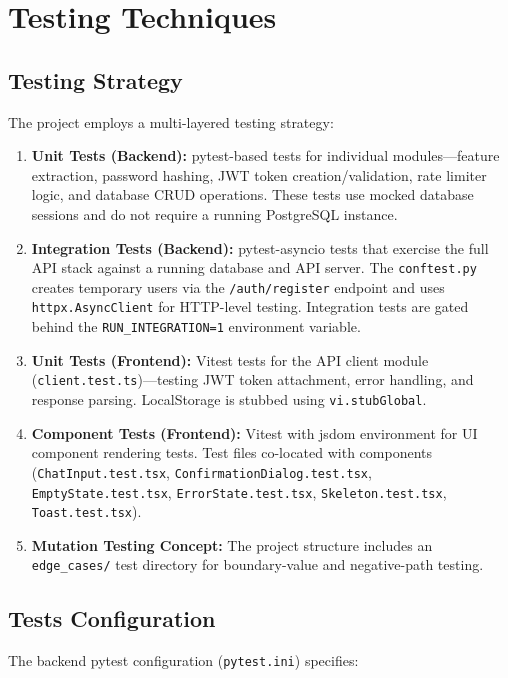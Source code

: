 \documentclass[12pt,a4paper]{report}
\begin{document}
\section{Testing Techniques}

\subsection{Testing Strategy}

The project employs a multi-layered testing strategy:

\begin{enumerate}[nosep]
    \item \textbf{Unit Tests (Backend):} pytest-based tests for individual modules---feature extraction, password hashing, JWT token creation/validation, rate limiter logic, and database CRUD operations. These tests use mocked database sessions and do not require a running PostgreSQL instance.
    \item \textbf{Integration Tests (Backend):} pytest-asyncio tests that exercise the full API stack against a running database and API server. The \texttt{conftest.py} creates temporary users via the \texttt{/auth/register} endpoint and uses \texttt{httpx.AsyncClient} for HTTP-level testing. Integration tests are gated behind the \texttt{RUN\_INTEGRATION=1} environment variable.
    \item \textbf{Unit Tests (Frontend):} Vitest tests for the API client module (\texttt{client.test.ts})---testing JWT token attachment, error handling, and response parsing. LocalStorage is stubbed using \texttt{vi.stubGlobal}.
    \item \textbf{Component Tests (Frontend):} Vitest with jsdom environment for UI component rendering tests. Test files co-located with components (\texttt{ChatInput.test.tsx}, \texttt{ConfirmationDialog.test.tsx}, \texttt{EmptyState.test.tsx}, \texttt{ErrorState.test.tsx}, \texttt{Skeleton.test.tsx}, \texttt{Toast.test.tsx}).
    \item \textbf{Mutation Testing Concept:} The project structure includes an \texttt{edge\_cases/} test directory for boundary-value and negative-path testing.
\end{enumerate}

\subsection{Tests Configuration}

The backend pytest configuration (\texttt{pytest.ini}) specifies:
\end{document}
